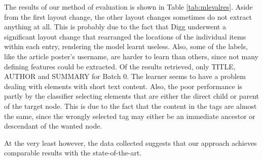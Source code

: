 	The results of our method of evaluation is shown in Table \ref{tab:mlevalres}.
Aside from the first layout change, the other layout changes sometimes do not extract anything
at all. This is probably due to the fact that Digg underwent a significant layout change that
rearranged the locations of the individual items within each entry, rendering the model learnt
useless. Also, some of the labels, like the article poster's username, are harder to learn
than others, since not many defining features could be extracted. Of the results retrieved,
only TITLE, AUTHOR and SUMMARY for Batch 0. The learner seems to have a problem dealing with
elements with short text content. Also, the poor performance is partly by 
the classifier selecting elements that are either the direct child or parent of the target node.
This is due to the fact that the content in the tags are almost the same, since the wrongly
selected tag may either be an immediate ancestor or descendant of the wanted node.
	
	At the very least however, the data collected suggests that our approach achieves comparable
results with the state-of-the-art.